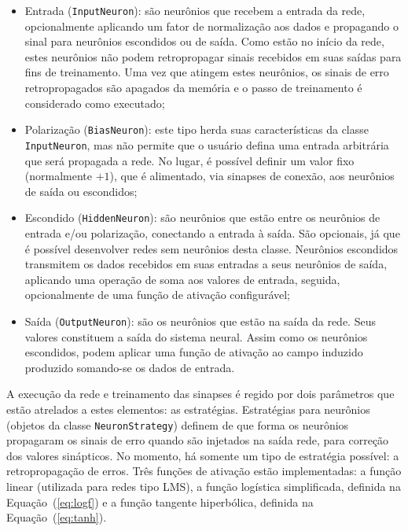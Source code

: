 \begin{itemize}
\item Entrada (\texttt{InputNeuron}): são neurônios que recebem a entrada
da rede, opcionalmente aplicando um fator de normalização aos dados e
propagando o sinal para neurônios escondidos ou de saída. Como estão no início
da rede, estes neurônios não podem retropropagar sinais recebidos em suas
saídas para fins de treinamento. Uma vez que atingem estes neurônios, os
sinais de erro retropropagados são apagados da memória e o passo de
treinamento é considerado como executado;

\item Polarização (\texttt{BiasNeuron}): este tipo herda suas 
caracte\-rís\-ticas da classe \texttt{In\-put\-Neuron}, mas não permite que o
usu\-á\-rio defina uma entrada arbitrária que será propagada a rede. No lugar,
é possível definir um valor fixo (normalmente $+1$), que é alimentado, via
sinapses de conexão, aos neurônios de saída ou escondidos;

\item Escondido (\texttt{HiddenNeuron}): são neurônios que estão entre os
neurônios de entrada e/ou polarização, conectando a entrada à saída. São
opcionais, já que é possível desenvolver redes sem neurônios desta
classe. Neurônios escondidos transmitem os dados recebidos em suas entradas a
seus neurônios de saída, aplicando uma operação de soma aos valores de
entrada, seguida, opcionalmente de uma função de ativação configurável;

\item Saída (\texttt{OutputNeuron}): são os neurônios que estão na saída da
rede. Seus valores constituem a saída do sistema neural. Assim como os
neurônios escondidos, podem aplicar uma função de ativação ao campo induzido
produzido somando-se os dados de entrada.
\end{itemize}

A execução da rede e treinamento das sinapses é regido por dois parâmetros que
estão atrelados a estes elementos: as estratégias. Estratégias para neurônios
(objetos da classe \texttt{NeuronStrategy}) definem de que forma os neurônios
propagaram os sinais de erro quando são injetados na saída rede, para correção
dos valores sinápticos. No momento, há somente um tipo de estratégia possível:
a retropropagação de erros. Três funções de ativação estão implementadas: a
função linear (utilizada para redes tipo LMS), a função logística
simplificada, definida na Equação~(\ref{eq:logf}) e a função tangente
hiperbólica, definida na Equação~(\ref{eq:tanh}).

